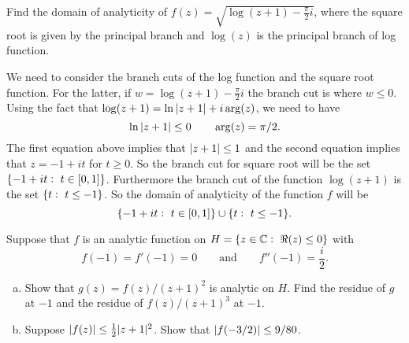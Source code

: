 \begin{problem}
	Find the domain of analyticity of $ f(z) = \sqrt{\log(z+1) - \frac{\pi}{2}i} $, where the square root is given by the principal branch and $ \log(z) $ is the principal branch of log function.
\end{problem}
\begin{solution}
	We need to consider the branch cuts of the log function and the square root function. For the latter, if $ w = \log(z+1) - \frac{\pi}{2}i $ the branch cut is where $ w \leq 0 $. Using the fact that $ \log(z+1) = \ln|z+1| + i\arg(z) $, we need to have
	\[ \ln|z+1| \leq 0 \qquad \arg(z) = \pi/2. \]
	The first equation above implies that $ |z+1|\leq 1 $ and the second equation implies that $ z = -1 + it $ for $ t\geq 0 $. So the branch cut for square root will be the set $ \{-1+it:\ t \in [0,1] \} $. Furthermore the branch cut of the function $ \log(z+1) $ is the set $ \{t:\ t\leq -1\} $. So the domain of analyticity of the function $ f $ will be
	\[ \{-1+it:\ t \in [0,1] \} \cup \{t:\ t\leq -1\}. \]
\end{solution}

\begin{problem}
	Suppose that $ f $ is an analytic function on $ H = \set{z\in \C:\ \real(z)\leq 0} $ with
	\[ f(-1) = f'(-1) = 0 \qquad \text{and} \qquad f''(-1) = \frac{i}{2}. \]
	\begin{enumerate}[(a)]
		\item Show that $ g(z)=f(z)/(z+1)^2 $ is analytic on $ H $. Find the residue of $ g $ at $ -1 $ and the residue of $ f(z)/(z+1)^3 $ at $ -1 $.
		\item Suppose $ |f(z)|\leq \frac{1}{2}|z+1|^2 $. Show that $ |f(-3/2)|\leq 9/80 $.
	\end{enumerate}
\end{problem}

